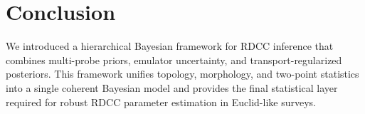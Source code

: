 \documentclass[11pt,a4paper]{article}
\begin{document}
\section{Conclusion}

We introduced a hierarchical Bayesian framework for RDCC inference that combines 
multi-probe priors, emulator uncertainty, and transport-regularized posteriors. 
This framework unifies topology, morphology, and two-point statistics into a 
single coherent Bayesian model and provides the final statistical layer required 
for robust RDCC parameter estimation in Euclid-like surveys.


\nocite{*}

\end{document}
